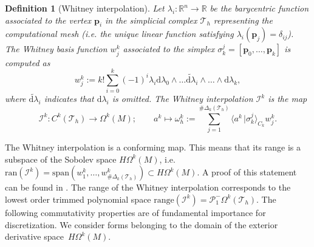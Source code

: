 \documentclass{elsarticle}
\newtheorem{definition}{Definition}
\renewcommand\d{\ensuremath{\mathrm{d}}}
\newcommand{\bbR}{\mathbb{R}}
\newcommand{\dualpr}[3][]{\ensuremath{\langle #2 \, \vert #3 \rangle_{#1}}}
\begin{document}
\begin{definition}[Whitney interpolation]
Let $\lambda_i:\bbR^n \rightarrow \bbR$
be the barycentric function associated to the vertex $\mathbf{p}_i$ in the 
simplicial complex $\mathcal{T}_h$ representing the computational mesh
(i.e. the unique linear function satisfying $\lambda_i(\mathbf{p}_j) = \delta_{ij}$). \\
The Whitney basis function $w_j^k$ associated to the simplex $\sigma_k^j = [\mathbf{p}_0, \dots, \mathbf{p}_k]$ is computed as
\begin{equation}
    w^k_j := k! \sum_{i=0}^k (-1)^i \lambda_i \d\lambda_0 \wedge \dots \widetilde{\d\lambda}_i \wedge \dots \wedge \d\lambda_k,
\end{equation}
where $\widetilde{\d\lambda}_i$ indicates that $\d\lambda_i$ is omitted. The Whitney interpolation $\mathcal{I}^k$ is the map
\begin{equation*}
    \mathcal{I}^k:
  C^k(\mathcal{T}_h) \rightarrow \Omega^k(M) ; \qquad 
    a^k \mapsto \omega^k_h:= \sum_{j=1}^{\# \Delta_k(\mathcal{T}_h)}  \dualpr[C_k]{a^k}{\sigma_k^j} w^k_j.
\end{equation*}
\end{definition}
The Whitney interpolation is a conforming map. This means that its range is a subspace of the Sobolev space $H\Omega^k(M)$, i.e. $\text{ran}(\mathcal{I}^k)=\text{span}(w^k_1, \hdots, w^k_{\#\Delta_k(\mathcal{T}_h)})
\subset H\Omega^k(M)$. A proof of this statement can be found in \cite[Theorem 4.4.]{gillette2011stability}. The range of the Whitney interpolation corresponds to the lowest order trimmed polynomial space $\text{range}(\mathcal{I}^k) = \mathcal{P}^{-}_1\Omega^k(\mathcal{T}_h)$. The following commutativity properties are of fundamental importance for discretization. We consider forms belonging to the domain of the exterior derivative 
space~$H\Omega^k(M)$. 
\end{document}
